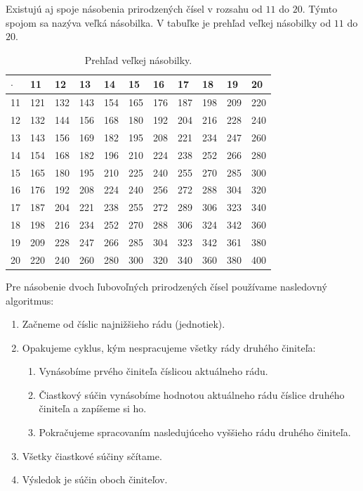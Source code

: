 \documentclass{report}
\begin{document}
Existujú aj spoje násobenia prirodzených čísel v rozsahu od \(11\) do \(20\). Týmto spojom sa nazýva veľká násobilka. V tabuľke je prehľad veľkej násobilky od \(11\) do \(20\).
\begin{table}[H]
  \centering
  \renewcommand{\arraystretch}{1.3}
  \begin{tabular}{C|CCCCCCCCCC}
    \(\cdot\) & 11 & 12 & 13 & 14 & 15 & 16 & 17 & 18 & 19 & 20 \\
     & 121 & 132 & 143 & 154 & 165 & 176 & 187 & 198 & 209 & 220 \\
    12 & 132 & 144 & 156 & 168 & 180 & 192 & 204 & 216 & 228 & 240 \\
    13 & 143 & 156 & 169 & 182 & 195 & 208 & 221 & 234 & 247 & 260 \\
    14 & 154 & 168 & 182 & 196 & 210 & 224 & 238 & 252 & 266 & 280 \\
    15 & 165 & 180 & 195 & 210 & 225 & 240 & 255 & 270 & 285 & 300 \\
    16 & 176 & 192 & 208 & 224 & 240 & 256 & 272 & 288 & 304 & 320 \\
    17 & 187 & 204 & 221 & 238 & 255 & 272 & 289 & 306 & 323 & 340 \\
    18 & 198 & 216 & 234 & 252 & 270 & 288 & 306 & 324 & 342 & 360 \\
    19 & 209 & 228 & 247 & 266 & 285 & 304 & 323 & 342 & 361 & 380 \\
    20 & 220 & 240 & 260 & 280 & 300 & 320 & 340 & 360 & 380 & 400 \\
  \end{tabular}
  \caption{Prehľad veľkej násobilky.}
\end{table}

Pre násobenie dvoch ľubovoľných prirodzených čísel používame nasledovný algoritmus:
\begin{enumerate}[label=\arabic*)]
  \item Začneme od číslic najnižšieho rádu (jednotiek).
  \item Opakujeme cyklus, kým nespracujeme všetky rády druhého činiteľa:
  \begin{enumerate}
    \item Vynásobíme prvého činiteľa číslicou aktuálneho rádu.
    \item Čiastkový súčin vynásobíme hodnotou aktuálneho rádu číslice druhého činiteľa a zapíšeme si ho.
    \item Pokračujeme spracovaním nasledujúceho vyššieho rádu druhého činiteľa.
  \end{enumerate}
  \item Všetky čiastkové súčiny sčítame.
  \item Výsledok je súčin oboch činiteľov.
\end{enumerate}
\end{document}
